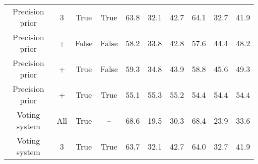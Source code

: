 \begin{table}[h!]
{\begin{tabular}{|c|ccc|ccc|ccc|}
    Precision prior                  & 3                                                                                                    & True                                                                                                      & True                               & 63.8                                 & 32.1                                    & 42.7              & 64.1                                 & 32.7                                    & 41.9              \\
    Precision prior                  & +                                                                                                    & False                                                                                                     & False                              & 58.2                                 & 33.8                                    & 42.8              & 57.6                                 & 44.4                                    & 48.2              \\
    Precision prior                  & +                                                                                                    & True                                                                                                      & False                              & 59.3                                 & 34.8                                    & 43.9              & 58.8                                 & 45.6                                    & 49.3              \\
    Precision prior                  & +                                                                                                    & True                                                                                                      & True                               & 55.1                                 & 55.3                                    & 55.2              & 54.4                                 & 54.4                                    & 54.4              \\ \hline
    Voting system                    & All                                                                                                  & True                                                                                                      & --                        & 68.6                        & 19.5                           & 30.3     & 68.4                        & 23.9                           & 33.6     \\
    Voting system                    & 3                                                                                                    & True                                                                                                      & True                               & 63.7                                 & 32.1                                    & 42.7              & 64.0                                   & 32.7                                    & 41.9              \\

\end{tabular}}
\end{table}
